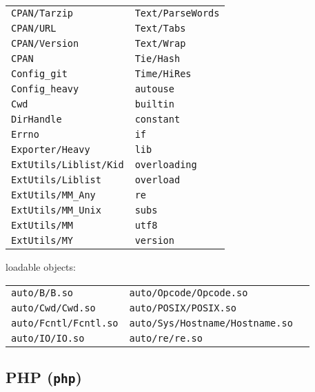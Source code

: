 {\begin{longtable}{l l}
\texttt{CPAN/Tarzip} & \texttt{Text/ParseWords} \\
\texttt{CPAN/URL} & \texttt{Text/Tabs} \\
\texttt{CPAN/Version} & \texttt{Text/Wrap} \\
\texttt{CPAN} & \texttt{Tie/Hash} \\
\texttt{Config\_git} & \texttt{Time/HiRes} \\
\texttt{Config\_heavy} & \texttt{autouse} \\
\texttt{Cwd} & \texttt{builtin} \\
\texttt{DirHandle} & \texttt{constant} \\
\texttt{Errno} & \texttt{if} \\
\texttt{Exporter/Heavy} & \texttt{lib} \\
\texttt{ExtUtils/Liblist/Kid} & \texttt{overloading} \\
\texttt{ExtUtils/Liblist} & \texttt{overload} \\
\texttt{ExtUtils/MM\_Any} & \texttt{re} \\
\texttt{ExtUtils/MM\_Unix} & \texttt{subs} \\
\texttt{ExtUtils/MM} & \texttt{utf8} \\
\texttt{ExtUtils/MY} & \texttt{version} \\
\end{longtable}
loadable objects:
\setlength{\tabcolsep}{15pt}
\begin{longtable}{l l l}
\texttt{auto/B/B.so} & \texttt{auto/Opcode/Opcode.so} \\
\texttt{auto/Cwd/Cwd.so} & \texttt{auto/POSIX/POSIX.so} \\
\texttt{auto/Fcntl/Fcntl.so} & \texttt{auto/Sys/Hostname/Hostname.so} \\
\texttt{auto/IO/IO.so} & \texttt{auto/re/re.so} \\
\end{longtable}
}

\subsection{PHP (\texttt{php})}





